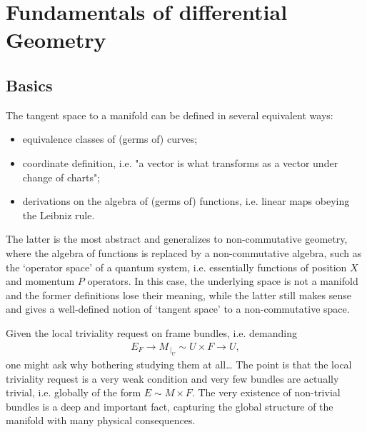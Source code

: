 \documentclass[../geometry_main.tex]{subfiles}
\begin{document}
\chapter{Fundamentals of differential Geometry}


\section{Basics} 

\begin{mytheorem}
The tangent space to a manifold can be defined in several equivalent ways:
\begin{itemize}
    \item equivalence classes of (germs of) curves;
    \item coordinate definition, i.e. "a vector is what transforms as a vector under change of charts";
    \item derivations on the algebra of (germs of) functions, i.e. linear maps obeying the Leibniz rule.
\end{itemize}
The latter is the most abstract and generalizes to non-commutative geometry, where the algebra of functions is replaced by a non-commutative algebra, such as the `operator space' of a quantum system, i.e. essentially functions of position $X$ and momentum $P$ operators.
In this case, the underlying space is not a manifold and the former definitions lose their meaning, while the latter still makes sense and gives a well-defined notion of `tangent space' to a non-commutative space.
\end{mytheorem}

\begin{mytheorem}
Given the local triviality request on frame bundles, i.e. demanding
\begin{align}
    E_F\to M_{\, |_{U}}\sim U\times F \to U,
\end{align}
one might ask why bothering studying them at all\dots
The point is that the local triviality request is a very weak condition and very few bundles are actually trivial, i.e. globally of the form $E\sim M\times F$.
The very existence of non-trivial bundles is a deep and important fact, capturing the global structure of the manifold with many physical consequences.
\end{mytheorem}
\end{document}
